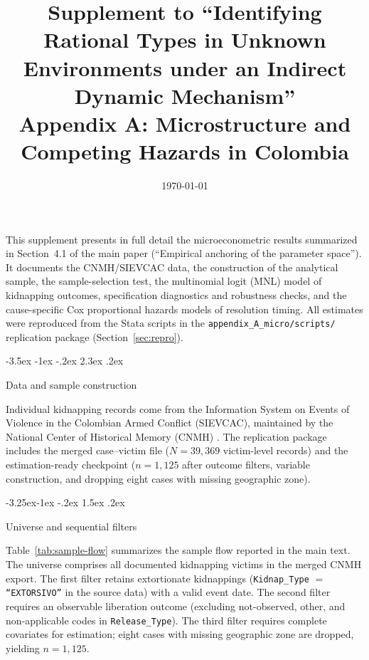 \documentclass[12pt]{article}
\makeatletter
\numberwithin{equation}{section}
\numberwithin{table}{section}
\renewcommand\section{\@startsection {section}{1}{\z@}%
                                   {-3.5ex \@plus -1ex \@minus -.2ex}%
                                   {2.3ex \@plus.2ex}%
                                   {\normalfont\Large\bfseries\raggedright}}
\renewcommand\subsection{\@startsection{subsection}{2}{\z@}%
                                     {-3.25ex\@plus -1ex \@minus -.2ex}%
                                     {1.5ex \@plus .2ex}%
                                     {\normalfont\large\bfseries\raggedright}}
\makeatother
\begin{document}
\title{Supplement to ``Identifying Rational Types in Unknown Environments under an Indirect Dynamic Mechanism''\\
Appendix A: Microstructure and Competing Hazards in Colombia}
\author{}
\date{\today}
\maketitle

\noindent
This supplement presents in full detail the microeconometric results
summarized in Section~4.1 of the main paper (``Empirical anchoring of the
parameter space''). It documents the CNMH/SIEVCAC data, the construction
of the analytical sample, the sample-selection test, the multinomial logit
(MNL) model of kidnapping outcomes, specification diagnostics and robustness
checks, and the cause-specific Cox proportional hazards models of resolution
timing. All estimates were reproduced from the Stata scripts in the
\texttt{appendix\_A\_micro/scripts/} replication package (Section~\ref{sec:repro}).

\section{Data and sample construction}
\label{sec:data}

Individual kidnapping records come from the Information System on Events of
Violence in the Colombian Armed Conflict (SIEVCAC), maintained by the
National Center of Historical Memory (CNMH) \citep{cnmh_datos,CNMH2013}.
The replication package includes the merged case--victim file
 ($N=39{,}369$ victim-level records) and the
estimation-ready checkpoint  ($n=1{,}125$
after outcome filters, variable construction, and dropping eight cases with
missing geographic zone).

\subsection{Universe and sequential filters}

Table~\ref{tab:sample-flow} summarizes the sample flow reported in the main
text. The universe comprises all documented kidnapping victims in the merged
CNMH export. The first filter retains extortionate kidnappings
(\texttt{Kidnap\_Type} $=$ \texttt{``EXTORSIVO''} in the source data) with a valid event date. The second
filter requires an observable liberation outcome (excluding not-observed,
other, and non-applicable codes in \texttt{Release\_Type}). The third
filter requires complete covariates for estimation; eight cases with missing
geographic zone are dropped, yielding $n=1{,}125$.
\end{document}
